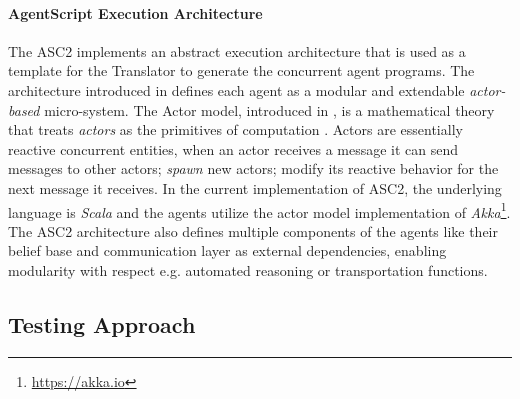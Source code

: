 \paragraph{AgentScript Execution Architecture}
The ASC2 implements an abstract execution architecture that is used as a template for the Translator to generate the concurrent agent programs. The architecture introduced in \cite{MohajeriParizi2020} defines each agent as a modular and extendable \textit{actor-based} micro-system. The Actor model, introduced in \cite{Hewitt}, is a mathematical theory that treats \textit{actors} as the primitives of computation \cite{hewitt2010actor}. Actors are essentially reactive concurrent entities, when an actor receives a message it can send messages to other actors; \textit{spawn} new actors; modify its reactive behavior for the next message it receives. In the current implementation of ASC2, the underlying language is \textit{Scala} and the agents utilize the actor model implementation of \textit{Akka}\footnote{\url{https://akka.io}}.  The ASC2 architecture also defines multiple components of the agents like their belief base and communication layer as external dependencies, enabling modularity with respect e.g. automated reasoning or transportation functions. 




\subsection{Testing Approach\label{sec:testing-approach}}



